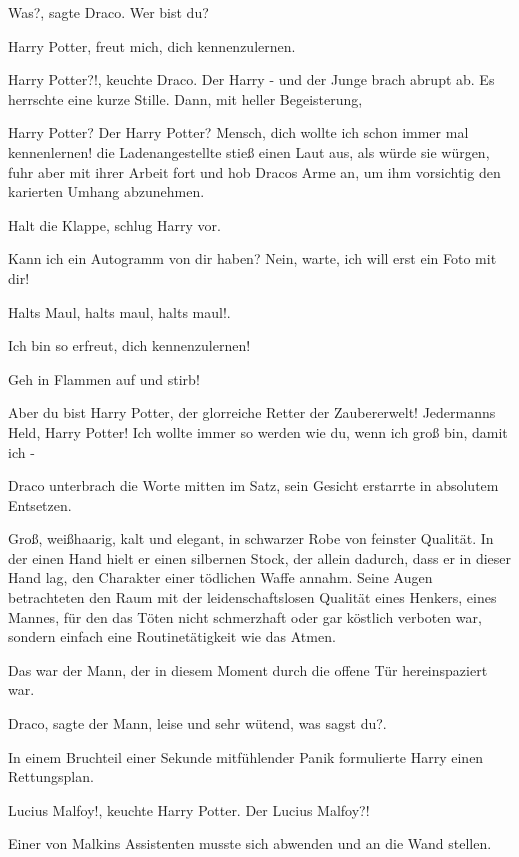 \glqq{}Was?\grqq{}, sagte Draco. \glqq{}Wer bist du?\grqq{}

\glqq{}Harry Potter, freut mich, dich kennenzulernen.\grqq{}

\glqq{}Harry Potter?!\grqq{}, keuchte Draco. \glqq{}Der Harry -\grqq{} und der
Junge brach abrupt ab. Es herrschte eine kurze Stille. Dann, mit heller
Begeisterung,

\glqq{}Harry Potter? Der Harry Potter? Mensch, dich wollte ich schon immer mal
kennenlernen!\grqq{} die Ladenangestellte stieß einen Laut aus, als würde sie
würgen, fuhr aber mit ihrer Arbeit fort und hob Dracos Arme an, um ihm
vorsichtig den karierten Umhang abzunehmen.

\glqq{}Halt die Klappe\grqq{}, schlug Harry vor.

\glqq{}Kann ich ein Autogramm von dir haben? Nein, warte, ich will erst ein Foto
mit dir!\grqq{}

\glqq{}Halts Maul, halts maul, halts maul!.\grqq{}

\glqq{}Ich bin so erfreut, dich kennenzulernen!\grqq{}

\glqq{}Geh in Flammen auf und stirb!\grqq{}

\glqq{}Aber du bist Harry Potter, der glorreiche Retter der Zaubererwelt!
Jedermanns Held, Harry Potter! Ich wollte immer so werden wie du, wenn ich groß
bin, damit ich -\grqq{}

Draco unterbrach die Worte mitten im Satz, sein Gesicht erstarrte in absolutem
Entsetzen.

Groß, weißhaarig, kalt und elegant, in schwarzer Robe von feinster Qualität. In
der einen Hand hielt er einen silbernen Stock, der allein dadurch, dass er in
dieser Hand lag, den Charakter einer tödlichen Waffe annahm. Seine Augen
betrachteten den Raum mit der leidenschaftslosen Qualität eines Henkers, eines
Mannes, für den das Töten nicht schmerzhaft oder gar köstlich verboten war,
sondern einfach eine Routinetätigkeit wie das Atmen.

Das war der Mann, der in diesem Moment durch die offene Tür hereinspaziert war.

\glqq{}Draco\grqq{}, sagte der Mann, leise und sehr wütend, \glqq{}was sagst
du?\grqq{}.

In einem Bruchteil einer Sekunde mitfühlender Panik formulierte Harry einen
Rettungsplan.

\glqq{}Lucius Malfoy!\grqq{}, keuchte Harry Potter. \glqq{}Der Lucius
Malfoy?!\grqq{}

Einer von Malkins Assistenten musste sich abwenden und an die Wand stellen.


